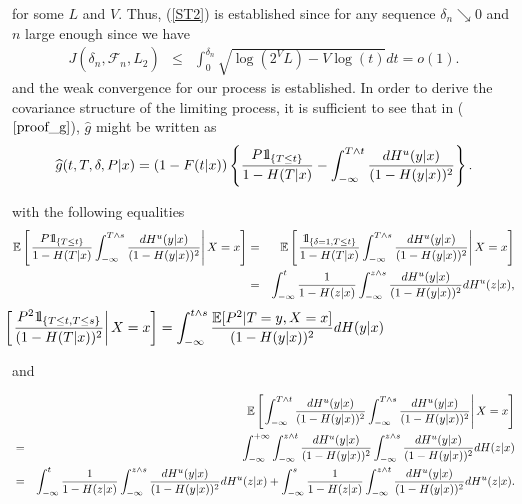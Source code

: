 \documentclass[12pt]{article}
\def\ind{ {{\rm 1}\hskip-2.2pt{\rm l}}}
\begin{document}
for some $L$ and $V$. Thus, (\ref{ST2}) is established since for any sequence $\delta_n\searrow 0$ and $n$ large enough since we have
\begin{eqnarray*}
J(\delta_n,\widehat{\mathcal{F}}_n,L_2)
&\leq&\int_0^{\delta_n}\sqrt{\log(2^VL)-V\log(t)}dt=o(1).
\end{eqnarray*}
and the weak convergence for our process is established. In order to derive the covariance structure of the limiting process, it is sufficient to see that in ($\ref{proof_g}$), $\widehat{g}$ might be written as
\begin{eqnarray*}
\widehat{g}(t,T,\delta,P|x)=(1-F(t|x))\left\{\dfrac{P\ind_{\{T\leq t\}}}{1-H(T|x)}-\int_{-\infty}^{T\nonumber\wedge t}\dfrac{dH^u(y|x)}{(1-H(y|x))^2}\right\}.
\end{eqnarray*}

with the following equalities 
\begin{eqnarray*}
\mathbb{E}\left[\left.\dfrac{P\ind_{\{T\leq t\}}}{1-H(T|x)}\int_{-\infty}^{T\wedge s}\dfrac{dH^u(y|x)}{(1-H(y|x))^2}\right| X=x\right]&=&\mathbb{E}\left[\left.\dfrac{\ind_{\{\delta=1, T\leq t\}}}{1-H(T|x)}\int_{-\infty}^{T\wedge s}\dfrac{dH^u(y|x)}{(1-H(y|x))^2}\right| X=x\right]\\
&=&\int_{-\infty}^t\dfrac{1}{1-H(z|x)}\int_{-\infty}^{z\wedge s}\dfrac{dH^u(y|x)}{(1-H(y|x))^2}dH^u(z|x),
\end{eqnarray*}
\begin{eqnarray*}
\hspace{-3.8cm}\mathbb{E}\left[\left.\dfrac{P^2\ind_{\{T\leq t,T\leq s\}}}{(1-H(T|x))^2}\right| X=x\right]=\int_{-\infty}^{t\wedge s}\dfrac{\mathbb{E}[P^2|T=y,X=x]}{(1-H(y|x))^2} dH(y|x)\\
\end{eqnarray*}

and

\begin{eqnarray*}
&&\hspace{-.9cm}\mathbb{E}\left[\left.\int_{-\infty}^{T\wedge t}\dfrac{dH^u(y|x)}{(1-H(y|x))^2}\int_{-\infty}^{T\wedge s}\dfrac{dH^u(y|x)}{(1-H(y|x))^2}\right| X=x\right]\\
&=&\int_{-\infty}^{+\infty}\int_{-\infty}^{z\wedge t}\dfrac{dH^u(y|x)}{(1-H(y|x))^2}\int_{-\infty}^{z\wedge s}\dfrac{dH^u(y|x)}{(1-H(y|x))^2}dH(z|x)\\
&=&\int_{-\infty}^t\dfrac{1}{1-H(z|x)}\int_{-\infty}^{z\wedge s}\dfrac{dH^u(y|x)}{(1-H(y|x))^2}dH^u(z|x)+\int_{-\infty}^s\dfrac{1}{1-H(z|x)}\int_{-\infty}^{z\wedge t}\dfrac{dH^u(y|x)}{(1-H(y|x))^2}dH^u(z|x).\\
\end{eqnarray*}
\end{document}

